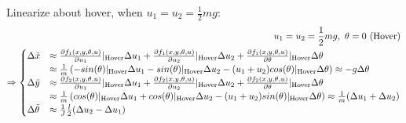 Linearize about hover, when $u_1=u_2=\frac{1}{2}mg$:
\begin{align*}
    u_1 = u_2 = \frac{1}{2} mg,  \ \theta = 0\text{ (\text{Hover})} \\          
    \Rightarrow
    \begin{cases}
        \Delta \ddot x      & \approx \frac{\partial f_1(x,y,\theta,u)}{\partial u_1}|_{\text{Hover}} \Delta u_1 + \frac{\partial f_1(x,y,\theta,u)}{\partial u_2}|_{\text{Hover}}\Delta u_2 + \frac{\partial f_1(x,y,\theta,u)}{\partial \theta}|_{\text{Hover}}\Delta \theta  \\
                            & \approx\frac{1}{m}\left(-sin(\theta)|_{\text{Hover}}\Delta u_1-sin(\theta)|_{\text{Hover}}\Delta u_2 -(u_1+u_2)cos(\theta)|_{\text{Hover}}\Delta \theta\right)\approx-g \Delta \theta                                                                                      \\
        \Delta \ddot y      & \approx \frac{\partial f_2(x,y,\theta,u)}{\partial u_1}|_{\text{Hover}} \Delta u_1 + \frac{\partial f_2(x,y,\theta,u)}{\partial u_2}|_{\text{Hover}}\Delta u_2 + \frac{\partial f_2(x,y,\theta,u)}{\partial \theta}|_{\text{Hover}}\Delta \theta  \\
                            & \approx \frac{1}{m}\left(cos(\theta)|_{\text{Hover}}\Delta u_1+cos(\theta)|_{\text{Hover}}\Delta u_2 -(u_1+u_2)sin(\theta)|_{\text{Hover}}\Delta \theta\right)\approx \frac{1}{m} (\Delta u_1 + \Delta u_2)                                                                \\
        \Delta \ddot \theta & \approx \frac{1}{J} \frac{l}{2}(\Delta u_2 - \Delta u_1)
    \end{cases}                                       \\
\end{align*}


